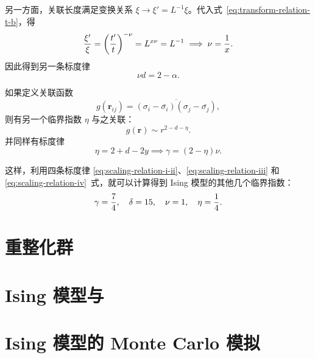 另一方面，关联长度满足变换关系 $\xi\to\xi'=L^{-1}\xi$。代入式~\eqref{eq:transform-relation-t-b}，得
\begin{equation}
  \frac{\xi'}{\xi} = \qty(\frac{t'}{t})^{-\nu} = L^{x\nu} = L^{-1}
  \implies \nu = \frac{1}{x}.
\end{equation}
因此得到另一条标度律
\begin{equation}
  \label{eq:scaling-relation-iii}
  \nu d = 2 - \alpha.
\end{equation}

如果定义关联函数
\begin{equation}
  g(\bm{r}_{ij}) = \overline{(\sigma_i-\bar{\sigma_i})(\sigma_j-\bar{\sigma_j})},
\end{equation}
则有另一个临界指数 $\eta$ 与之关联：
\begin{equation}
  g(\bm{r}) \sim r^{2-d-\eta}.
\end{equation}
并同样有标度律
\begin{equation}
  \label{eq:scaling-relation-iv}
  \eta = 2 + d - 2y \implies \gamma = (2-\eta) \nu.
\end{equation}

这样，利用四条标度律 \eqref{eq:scaling-relation-i-ii}、\eqref{eq:scaling-relation-iii} 和
\eqref{eq:scaling-relation-iv}~式，就可以计算得到 Ising 模型的其他几个临界指数：
\begin{equation}
  \gamma = \frac{7}{4} \qc
  \delta = 15          \qc
  \nu    = 1           \qc
  \eta   = \frac{1}{4}.
\end{equation}

\section{重整化群}
\section{Ising 模型与 \AdSCFT{}}
\section{Ising 模型的 Monte Carlo 模拟}
